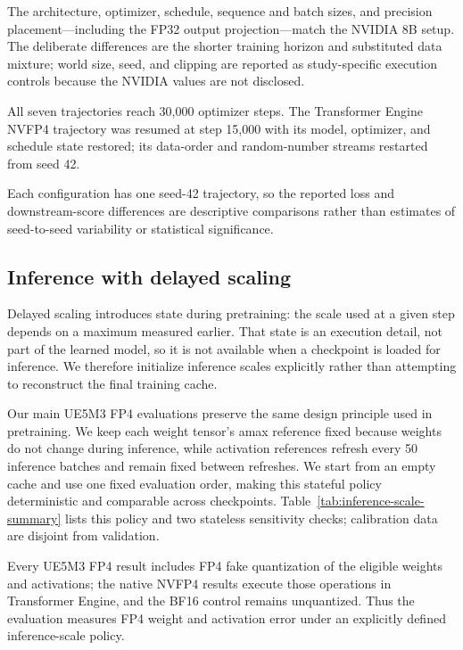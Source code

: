 \documentclass[11pt]{article}
\newcommand{\uefp}{UE5M3 FP4}
\newcommand{\nv}{NVFP4}
\begin{document}
The architecture, optimizer, schedule, sequence and batch sizes, and precision
placement---including the FP32 output projection---match the NVIDIA 8B setup.
The deliberate differences are the shorter training horizon and substituted
data mixture; world size, seed, and clipping are reported as study-specific
execution controls because the NVIDIA values are not disclosed.

All seven trajectories reach 30,000 optimizer steps.  The Transformer Engine
\nv{} trajectory was resumed at step 15,000 with its model, optimizer, and
schedule state restored; its data-order and random-number streams restarted
from seed 42.

Each configuration has one seed-42 trajectory, so the reported loss and
downstream-score differences are descriptive comparisons rather than estimates
of seed-to-seed variability or statistical significance.

\subsection{Inference with delayed scaling}
\label{sec:post-load-inference}

Delayed scaling introduces state during pretraining: the scale used at a given
step depends on a maximum measured earlier.  That state is an execution detail,
not part of the learned model, so it is not available when a checkpoint is
loaded for inference.  We therefore initialize inference scales explicitly
rather than attempting to reconstruct the final training cache.

Our main \uefp{} evaluations preserve the same design principle used in
pretraining.  We keep each weight tensor's amax reference fixed because weights
do not change during inference, while activation references refresh every 50 inference batches
and remain fixed between refreshes.  We start from an empty cache and use one
fixed evaluation order, making this stateful policy deterministic and
comparable across checkpoints.  Table~\ref{tab:inference-scale-summary} lists
this policy and two stateless sensitivity checks; calibration data are
disjoint from validation.

Every \uefp{} result includes FP4 fake quantization of the eligible weights and
activations; the native \nv{} results execute those operations in Transformer
Engine, and the BF16 control remains unquantized.  Thus the evaluation measures
FP4 weight and activation error under an explicitly defined inference-scale
policy.
\end{document}
